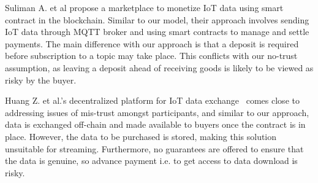 \documentclass[letterpaper, 10 pt, conference]{ieeeconf}  %
\begin{document}
Suliman A. et al \cite{19} propose a marketplace to monetize IoT data using smart contract in the blockchain. Similar to our model, their approach involves sending IoT data through MQTT broker and using smart contracts to manage and settle payments. The main difference with our approach is that a deposit is required before subscription to a topic may take place. This conflicts with our no-trust assumption, as leaving a deposit ahead of receiving goods is likely to be viewed as risky by the buyer.


Huang Z. et al.'s decentralized platform for IoT data exchange~\cite{12} comes close to addressing issues of mis-trust amongst participants, and similar to our approach, data is exchanged off-chain and made available to buyers once the contract is in place. However, the data to be purchased is stored, making this solution unsuitable for streaming. Furthermore, no guarantees are offered to ensure that the data is genuine, so advance payment i.e. to get access to data download is risky.
\end{document}
